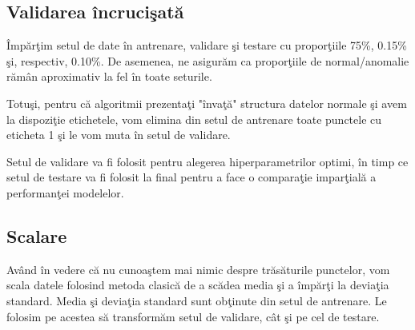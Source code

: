\subsection{Validarea încrucişată}

Împărţim setul de date în antrenare, validare şi testare cu proporţiile 75\%, 0.15\%
şi, respectiv, 0.10\%. De asemenea, ne asigurăm ca proporţiile de normal/anomalie 
rămân aproximativ la fel în toate seturile.

Totuşi, pentru că algoritmii prezentaţi "învaţă" structura datelor normale şi avem 
la dispoziţie etichetele, vom elimina din setul de antrenare toate punctele cu eticheta 
1 şi le vom muta în setul de validare.

Setul de validare va fi folosit pentru alegerea hiperparametrilor optimi, în timp ce 
setul de testare va fi folosit la final pentru a face o comparaţie imparţială 
a performanţei modelelor.

\subsection{Scalare}

Având în vedere că nu cunoaştem mai nimic despre trăsăturile punctelor, vom scala 
datele folosind metoda clasică de a scădea media şi a împărţi la deviaţia standard.
Media şi deviaţia standard sunt obţinute din setul de antrenare. Le folosim pe acestea 
să transformăm setul de validare, cât şi pe cel de testare.